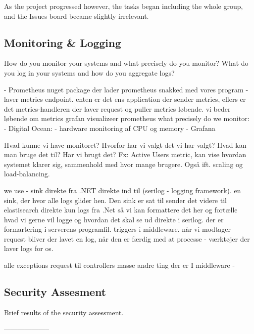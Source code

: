 \noindent As the project progressed however, the tasks began including the whole group, and the Issues board became slightly irrelevant.

\subsection{Monitoring \& Logging}
How do you monitor your systems and what precisely do you monitor?
What do you log in your systems and how do you aggregate logs?

- Prometheus
    nuget package der lader prometheus snakked med vores program - laver metrics endpoint.
    enten er det ens application der sender metrics, ellers er det metrics-handleren der laver request og puller metrics løbende. vi beder løbende om metrics
    grafan visualizeer prometheus
    what precisely do we monitor: 
- Digital Ocean:
    -   hardware monitoring af CPU og memory
- Grafana


Hvad kunne vi have monitoret? Hvorfor har vi valgt det vi har valgt? Hvad kan man bruge det til? Har vi brugt det?
Fx: Active Users metric, kan vise hvordan systemet klarer sig, sammenhold med hvor mange brugere. Også ift. scaling og load-balancing.

we use - sink direkte fra .NET direkte ind til (serilog - logging framework). en sink, der hvor alle logs glider hen. Den sink er sat til 
sender det videre til elastisearch direkte
kun logs fra .Net så vi kan formattere det her og fortælle hvad vi gerne vil logge og hvordan det skal se ud direkte i serilog. 
der er formartering i serverens programfil. 
triggers i middleware. når vi modtager request bliver der lavet en log, når den er færdig med at processe - værktøjer der laver logs for os. 

alle exceptions
request til controllers
masse andre ting der er I middleware - 


\subsection{Security Assesment}
Brief results of the security assessment.



--------------------

